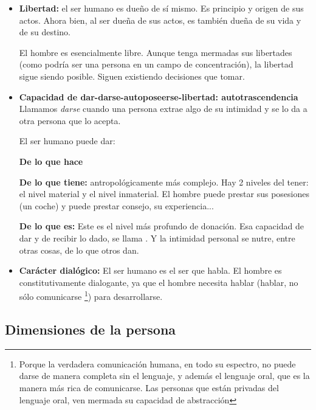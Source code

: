 \documentclass[palatino]{apuntesURJC}
\begin{document}
\begin{itemize}
	\item \textbf{Libertad:} el ser humano es dueño de sí mismo.
	Es principio y origen de sus actos. Ahora bien, al ser dueña de sus actos, es también dueña de su vida y de su destino.

	\subitem El hombre es esencialmente libre. Aunque tenga mermadas sus libertades (como podría ser una persona en un campo de concentración), la libertad sigue siendo posible.
	Siguen existiendo decisiones que tomar.

	\item \textbf{Capacidad de dar-darse-autoposeerse-libertad: autotrascendencia}
	Llamamos \textit{darse} cuando una persona extrae algo de su intimidad y se lo da a otra persona que lo acepta.

	El ser humano puede dar:

	\subitem \textbf{De lo que hace}

	\subitem \textbf{De lo que tiene:} antropológicamente más complejo. Hay 2 niveles del tener: el nivel material y el nivel inmaterial.
	El hombre puede prestar sus posesiones (un coche) y puede prestar consejo, su experiencia...

	\subitem \textbf{De lo que es:} Este es el nivel más profundo de donación.
	Esa capacidad de dar y de recibir lo dado, se llama .
	Y la intimidad personal se nutre, entre otras cosas, de lo que otros dan.

	\item \textbf{Carácter dialógico:} El ser humano es el ser que habla.
	El hombre es constitutivamente dialogante, ya que el hombre necesita hablar (hablar, no sólo comunicarse
	\footnote{Porque la verdadera comunicación humana, en todo su espectro, no puede darse de manera completa sin el lenguaje, y además el lenguaje oral, que es la manera más rica de comunicarse.
	Las personas que están privadas del lenguaje oral, ven mermada su capacidad de abstracción})
	para desarrollarse.

\end{itemize}


\subsection{Dimensiones de la persona}
\end{document}
